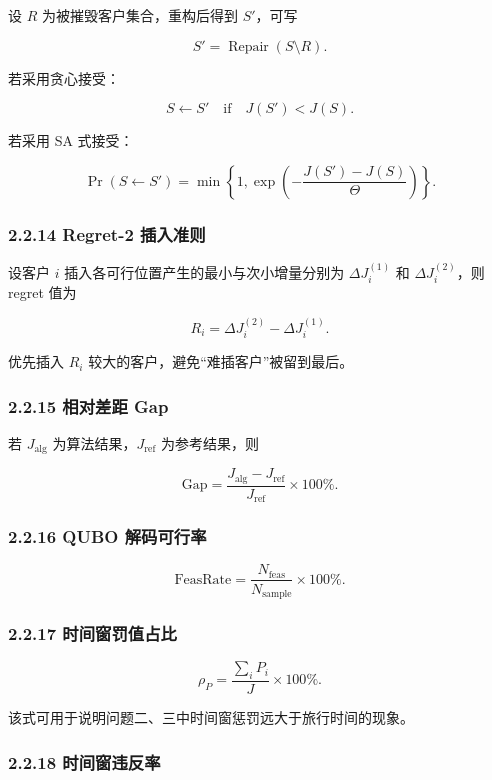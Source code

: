 \documentclass[
  a4paper,
]{ctexart}
\begin{document}
设 \(R\) 为被摧毁客户集合，重构后得到 \(S'\)，可写

\[
S' = \operatorname{Repair}\left(S\setminus R\right).
\]

若采用贪心接受：

\[
S\leftarrow S'\quad \text{if}\quad J(S')<J(S).
\]

若采用 SA 式接受：

\[
\Pr(S\leftarrow S')=\min\left\{1,\exp\left(-\frac{J(S')-J(S)}{\Theta}\right)\right\}.
\]

\subsubsection{2.2.14 Regret-2
插入准则}\label{regret-2-ux63d2ux5165ux51c6ux5219}

设客户 \(i\) 插入各可行位置产生的最小与次小增量分别为
\(\Delta J_i^{(1)}\) 和 \(\Delta J_i^{(2)}\)，则 regret 值为

\[
R_i=\Delta J_i^{(2)}-\Delta J_i^{(1)}.
\]

优先插入 \(R_i\) 较大的客户，避免``难插客户''被留到最后。

\subsubsection{2.2.15 相对差距 Gap}\label{ux76f8ux5bf9ux5deeux8ddd-gap}

若 \(J_{\mathrm{alg}}\) 为算法结果，\(J_{\mathrm{ref}}\) 为参考结果，则

\[
\mathrm{Gap}=\frac{J_{\mathrm{alg}}-J_{\mathrm{ref}}}{J_{\mathrm{ref}}}\times 100\%.
\]

\subsubsection{2.2.16 QUBO
解码可行率}\label{qubo-ux89e3ux7801ux53efux884cux7387}

\[
\mathrm{FeasRate}=\frac{N_{\mathrm{feas}}}{N_{\mathrm{sample}}}\times 100\%.
\]

\subsubsection{2.2.17
时间窗罚值占比}\label{ux65f6ux95f4ux7a97ux7f5aux503cux5360ux6bd4}

\[
\rho_P=\frac{\sum_i P_i}{J}\times 100\%.
\]

该式可用于说明问题二、三中时间窗惩罚远大于旅行时间的现象。

\subsubsection{2.2.18
时间窗违反率}\label{ux65f6ux95f4ux7a97ux8fddux53cdux7387}
\end{document}
